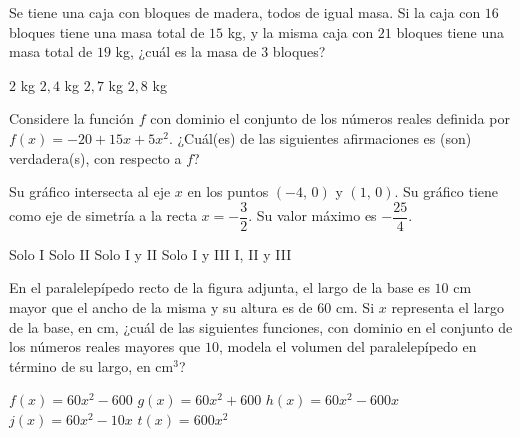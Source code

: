 \documentclass[borrador]{srs3}
\begin{document}
\begin{preguntas}
\pregunta Se tiene una caja con bloques de madera, todos de igual masa. Si la caja con \(16\) bloques tiene una masa total de \(15\) kg, y la misma caja con \(21\) bloques tiene una masa total de \(19\) kg, ¿cuál es la masa de \(3\) bloques?
\begin{alternativas}
\alternativa \(2\) kg
\alternativa \(2,4\) kg
\alternativa \(2,7\) kg
\alternativa \(2,8\) kg
\end{alternativas}
\pregunta Considere la función \(f\) con dominio el conjunto de los números reales definida por \(f\left(x\right)=-20+15x+5x^2\). ¿Cuál(es) de las siguientes afirmaciones es (son) verdadera(s), con respecto a \(f\)?
\begin{opciones}
\opcion Su gráfico intersecta al eje \(x\) en los puntos \(\left(-4,\,0\right)\) y \(\left(1,\,0\right)\).
\opcion Su gráfico tiene como eje de simetría a la recta \( x = -\dfrac{3}{2} \).
\opcion Su valor máximo es \(-\dfrac{25}{4}\).
\end{opciones}
\begin{alternativas}
\alternativa Solo I
\alternativa Solo II
\alternativa Solo I y II
\alternativa Solo I y III
\alternativa I, II y III
\end{alternativas}
\pregunta En el paralelepípedo recto de la figura adjunta, el largo de la base es \(10\) cm mayor que el ancho de la misma y su altura es de \(60\) cm.
Si \(x\) representa el largo de la base, en cm, ¿cuál de las siguientes funciones, con dominio en el conjunto de los números reales mayores que \(10\), modela el volumen del paralelepípedo en término de su largo, en cm\(^3\)?
\begin{columnas}[0.5][t]
\begin{alternativas}
\alternativa \( f\left(x\right)=60x^2-600 \)
\alternativa \( g\left(x\right)=60x^2+600 \)
\alternativa \( h\left(x\right)=60x^2-600x \)
\alternativa \( j\left(x\right)=60x^2-10x \)
\alternativa \( t\left(x\right)=600x^2 \)
\end{alternativas}
\siguiente
{}
\end{columnas}
\end{preguntas}
\end{document}
